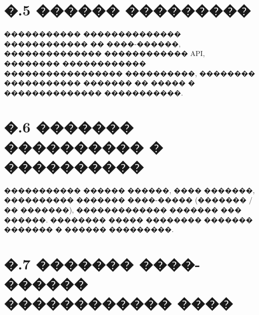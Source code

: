 \section*{�.5 ������ ���������}

����������� �������������� ������������ �� ����-������, �������������� ������������ API, �������� ������������ ����������������� ����������, �������� ����������� ������� �� ����� � �������������� �����������\cite{iso29119,kaner_testing_en,gost1930179}.

\section*{�.6 ������� ���������� � ����������}

����������� ������ ������, ���� �������, ���������� ������� ����-����� (������� / �� �������), ������������� ������� ��� ������. �������� ����� �������� ������� ������� � ������ ���������.

\section*{�.7 ������� ����-������ ������������ ����}

